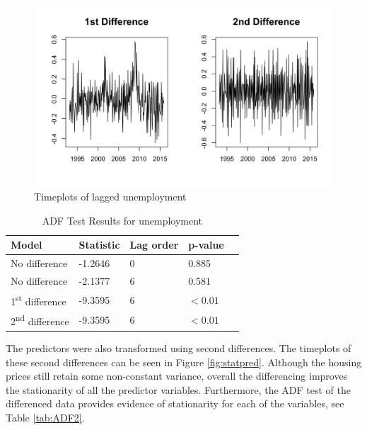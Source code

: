 \documentclass[twoside,twocolumn]{article}
\begin{document}
	\begin{figure}[htb]
		\centering
		\caption{Timeplots of lagged unemployment}
		\label{fig:seasonalunem}
		\includegraphics[width=\linewidth]{images/seasonalunem}
	\end{figure}

		 \begin{table}[htb]
		 \centering
		 \caption{ADF Test Results for unemployment}
		 \label{tab:ADF}
		 \begin{tabular}{lllll}
		 \hline
		 \textbf{Model} 								& \textbf{Statistic} & \textbf{Lag order} 	& \textbf{p-value}\\ \hline
		 No  difference 								&   -1.2646 				& 0 								& 0.885\\
		 No  difference 								&   -2.1377 				& 6 								& 0.581\\
		 1\textsuperscript{st} difference 	&  -9.3595 				& 6 								&\( < 0.01\)\\
		 2\textsuperscript{nd} difference 	&  -9.3595 				& 6 								& \( < 0.01\)\\	 \hline
		 \end{tabular}
		 \end{table}
The predictors were also transformed using second differences. The timeplots of these second differences can be seen in Figure \ref{fig:statpred}. Although the housing prices still retain some non-constant variance, overall the differencing improves the stationarity of all the predictor variables.  Furthermore, the ADF test of the differenced data provides evidence of stationarity for each of the variables, see Table \ref{tab:ADF2}.
\end{document}
